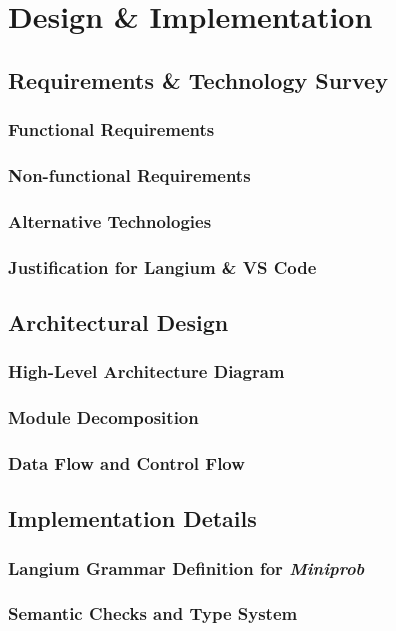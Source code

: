 \documentclass[11pt]{report}
\begin{document}
\part{Design \& Implementation}

\chapter{Requirements \& Technology Survey}
\section{Functional Requirements}
\section{Non-functional Requirements}
\section{Alternative Technologies}
\section{Justification for Langium \& VS Code}

\chapter{Architectural Design}
\section{High-Level Architecture Diagram}
\section{Module Decomposition}
\section{Data Flow and Control Flow}

\chapter{Implementation Details}
\label{sec:langium-grammar}
\section{Langium Grammar Definition for \textit{Miniprob}}
\section{Semantic Checks and Type System}
\end{document}
